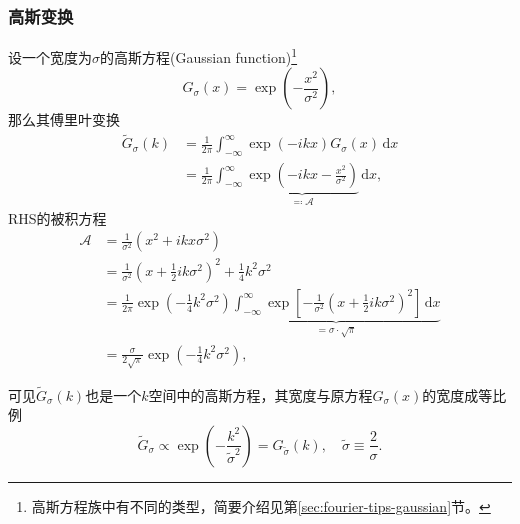 \subsubsection{高斯变换}
\label{sec:fourier-gaussian}
设一个宽度为$\sigma$的高斯方程(Gaussian function)\footnote{高斯方程族中有不同的类型，简要介绍见第\ref{sec:fourier-tips-gaussian}节。}
\begin{equation*}
  G_{\sigma}(x) = \exp \left( - \frac{x^{2}}{\sigma^{2}}\right),
\end{equation*}
那么其傅里叶变换
\begin{equation*}
  \begin{split}
    \widetilde{G}_{\sigma} \left( k \right)
    & = \frac{1}{2 \pi}
    \int_{-\infty}^{\infty} \exp \left( - i k x \right)
    G_{\sigma} \left( x \right) \, \mathrm{d} x \\
    & = \frac{1}{2 \pi}
    \int_{-\infty}^{\infty}
    \underbrace{
    \exp
    \left(
    - i k x - \frac{x^{2}}{\sigma^{2}}
    \right)
    }_{\eqqcolon \mathcal{A} }
    \, \mathrm{d} x,
  \end{split}
\end{equation*}
RHS的被积方程
\begin{equation*}
  \begin{split}
    \mathcal{A} & = \frac{1}{\sigma^{2}}
    \left( x^{2} + i k x \sigma^{2} \right) \\
    & = \frac{1}{\sigma^{2}}
    \left(
    x + \frac{1}{2} i k \sigma^{2}
    \right)^{2} + \frac{1}{4} k^{2} \sigma^{2} \\
    & = \frac{1}{2 \pi} \exp \left( - \frac{1}{4} k^{2} \sigma^{2} \right)
    \underbrace{
    \int_{-\infty}^{\infty} \exp
    \left[
    - \frac{1}{\sigma^{2}}
    \left( x + \frac{1}{2} i k \sigma^{2} \right)^{2}
    \right] \, \mathrm{d} x
    }_{= \sigma \cdot \sqrt{\pi}} \\
    & = \frac{\sigma}{2 \sqrt{\pi}} \exp \left( - \frac{1} {4} k^{2} \sigma^{2} \right),
  \end{split}
\end{equation*}

可见$\widetilde{G}_{\sigma}(k)$也是一个$k$空间中的高斯方程，其宽度与原方程$G_{\sigma}(x)$的宽度成等比例
\begin{equation*}
  \widetilde{G}_{\sigma} \propto \exp \left( - \frac{k^{2}}{\tilde{\sigma}^{2}} \right) = G_{\tilde{\sigma}} \left( k \right), \quad \tilde{\sigma} \equiv \frac{2}{\sigma}.
\end{equation*}

